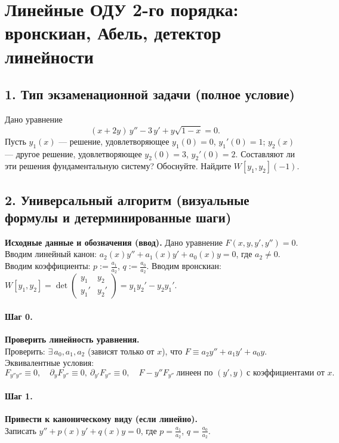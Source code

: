 \section{Линейные ОДУ 2-го порядка: вронскиан, Абель, детектор линейности}

\subsection*{1. Тип экзаменационной задачи (полное условие)}
Дано уравнение
\[
(x+2y)\,y''-3\,y'+y\sqrt{1-x}=0.
\]
Пусть \(y_{1}(x)\) — решение, удовлетворяющее \(y_{1}(0)=0\), \(y_{1}'(0)=1\); \(y_{2}(x)\) — другое решение, удовлетворяющее \(y_{2}(0)=3\), \(y_{2}'(0)=2\). Составляют ли эти решения фундаментальную систему? Обоснуйте. Найдите \(W[y_1,y_2](-1)\).

\subsection*{2. Универсальный алгоритм (визуальные формулы и детерминированные шаги)}

\textbf{Исходные данные и обозначения (ввод).} Дано уравнение \(F(x,y,y',y'')=0\).
Вводим линейный канон: \(a_2(x)y''+a_1(x)y'+a_0(x)y=0\), где \(a_2\neq0\).
Вводим коэффициенты: \(p:=\frac{a_1}{a_2}\), \(q:=\frac{a_0}{a_2}\).
Вводим вронскиан: \(W[y_1,y_2]=\det\begin{pmatrix}y_1 & y_2\\ y_1' & y_2'\end{pmatrix}=y_1y_2'-y_2y_1'\).

\paragraph{Шаг 0.} \textbf{Проверить линейность уравнения.}\\
Проверить: \(\exists\,a_0,a_1,a_2\) (зависят только от \(x\)), что \(F\equiv a_2y''+a_1y'+a_0y\).
Эквивалентные условия:
\[
F_{y''y''}\equiv0,\quad \partial_{y}F_{y''}\equiv0,\ \partial_{y'}F_{y''}\equiv0,\quad
F-y''F_{y''}\ \text{линеен по }(y',y)\ \text{с коэффициентами от }x.
\]

\paragraph{Шаг 1.} \textbf{Привести к каноническому виду (если линейно).}\\
Записать \(y''+p(x)y'+q(x)y=0\), где \(p=\frac{a_1}{a_2}\), \(q=\frac{a_0}{a_2}\).

